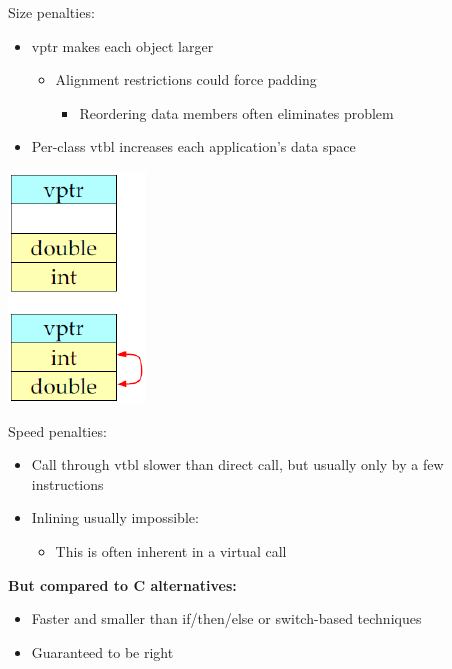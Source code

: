 \begin{minipage}{0.75\linewidth}
Size penalties:
\begin{itemize}
  \item vptr makes each object larger
  \begin{itemize}
    \item Alignment restrictions could force padding
    \begin{itemize}
      \item Reordering data members often eliminates problem
    \end{itemize}
  \end{itemize}
  \item Per-class vtbl increases each application's data space
\end{itemize}
\end{minipage}%
\hfill
\begin{minipage}{0.2\linewidth}
\begin{center}
  \includegraphics[width=0.5\linewidth]{images/AdvancedCPP/sizePenalties}
\end{center}
\end{minipage}%
\vspace{0.5\baselineskip}
Speed penalties:
\begin{itemize}
  \item Call through vtbl slower than direct call, but usually only by a few instructions
  \item Inlining usually impossible:
  \begin{itemize}
    \item This is often inherent in a virtual call
  \end{itemize}
\end{itemize}
\textbf{But compared to C alternatives:}
\begin{itemize}
  \item Faster and smaller than if/then/else or switch-based techniques
  \item Guaranteed to be right
\end{itemize}


